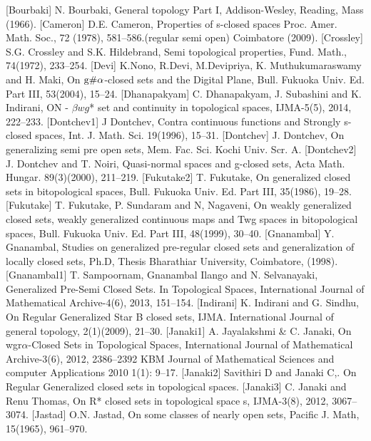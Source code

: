 \begin{thebibliography}{99}
 [Bourbaki] N. Bourbaki, General topology Part I, Addison-Wesley, Reading, Mass (1966).
 [Cameron] D.E. Cameron, Properties of s-closed spaces Proc. Amer. Math. Soc., 72 (1978), 581--586.(regular semi open) Coimbatore (2009).
 [Crossley] S.G. Crossley and S.K. Hildebrand, Semi topological properties, Fund. Math., 74(1972), 233--254.
 [Devi] K.Nono, R.Devi, M.Devipriya, K. Muthukumaraswamy and H. Maki, On $\mathrm{g}\#\alpha$-closed sets and the Digital Plane, Bull. Fukuoka Univ. Ed. Part III, 53(2004), 15--24.
 [Dhanapakyam] C. Dhanapakyam, J. Subashini and K. Indirani, ON - $\beta wg$* set and continuity in topological spaces, IJMA-5(5), 2014, 222--233.
 [Dontchev1] J Dontchev, Contra continuous functions and Strongly s-closed spaces, Int. J. Math. Sci. 19(1996), 15--31.
 [Dontchev] J. Dontchev, On generalizing semi pre open sets, Mem. Fac. Sci. Kochi Univ. Scr. A. 
 [Dontchev2] J. Dontchev and T. Noiri, Quasi-normal spaces and g-closed sets, Acta Math. Hungar. 89(3)(2000), 211--219.
 [Fukutake2] T. Fukutake, On generalized closed sets in bitopological spaces, Bull. Fukuoka Univ. Ed. Part III, 35(1986), 19--28.
 [Fukutake] T. Fukutake, P. Sundaram and N, Nagaveni, On weakly generalized closed sets, weakly generalized continuous maps and Twg spaces in bitopological spaces, Bull. Fukuoka Univ. Ed. Part III, 48(1999), 30--40.
  [Gnanambal] Y. Gnanambal, Studies on generalized pre-regular closed sets and generalization of locally closed sets, Ph.D, Thesis Bharathiar University, Coimbatore, (1998).
 [Gnanambal1] T. Sampoornam, Gnanambal Ilango and N. Selvanayaki, Generalized Pre-Semi Closed Sets. In Topological Spaces, International Journal of Mathematical Archive-4(6), 2013, 151--154.
 [Indirani] K. Indirani and G. Sindhu, On Regular Generalized Star B closed sets, IJMA. International Journal of general topology, 2(1)(2009), 21--30.
  [Janaki1] A. Jayalakshmi  \& C. Janaki, On wgr$\alpha$-Closed Sets in Topological Spaces, International Journal of Mathematical Archive-3(6), 2012, 2386--2392 KBM  Journal of Mathematical Sciences and computer Applications 2010 1(1): 9--17.
 [Janaki2] Savithiri D and Janaki C,. On Regular Generalized closed sets in topological spaces.
 [Janaki3] C. Janaki and Renu Thomas, On R* closed sets in topological space s, IJMA-3(8), 2012, 3067--3074.
 [Jastad] O.N. Jastad, On some classes of nearly open sets, Pacific J. Math, 15(1965), 961--970.

\end{thebibliography}
